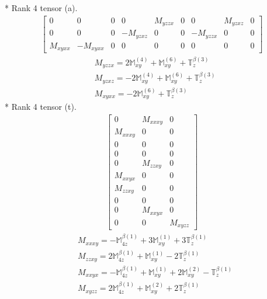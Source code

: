 \documentclass[fleqn,8pt,landscape]{jsarticle}
\begin{document}
* Rank 4 tensor (a).
\begin{align*}
\begin{bmatrix} 0 & 0 & 0 & 0 & M_{yzzx} & 0 & 0 & M_{yzxz} & 0 \\ 0 & 0 & 0 & - M_{yzxz} & 0 & 0 & - M_{yzzx} & 0 & 0 \\ M_{xyxx} & - M_{xyxx} & 0 & 0 & 0 & 0 & 0 & 0 & 0 \end{bmatrix}
\end{align*}
\begin{align*}
& M_{yzzx} = 2 \mathbb{M}_{xy}^{(4)} + \mathbb{M}_{xy}^{(6)} + \mathbb{T}_{z}^{\beta(3)} \\
& M_{yzxz} = - 2 \mathbb{M}_{xy}^{(4)} + \mathbb{M}_{xy}^{(6)} + \mathbb{T}_{z}^{\beta(3)} \\
& M_{xyxx} = - 2 \mathbb{M}_{xy}^{(6)} + \mathbb{T}_{z}^{\beta(3)}
\end{align*}
* Rank 4 tensor (t).
\begin{align*}
\begin{bmatrix} 0 & M_{xxxy} & 0 \\ M_{xxxy} & 0 & 0 \\ 0 & 0 & 0 \\ 0 & 0 & 0 \\ 0 & M_{zzxy} & 0 \\ M_{xxyx} & 0 & 0 \\ M_{zzxy} & 0 & 0 \\ 0 & 0 & 0 \\ 0 & M_{xxyx} & 0 \\ 0 & 0 & M_{xyzz} \end{bmatrix}
\end{align*}
\begin{align*}
& M_{xxxy} = - \mathbb{M}_{4z}^{\beta(1)} + 3 \mathbb{M}_{xy}^{(1)} + 3 \mathbb{T}_{z}^{\beta(1)} \\
& M_{zzxy} = 2 \mathbb{M}_{4z}^{\beta(1)} + \mathbb{M}_{xy}^{(1)} - 2 \mathbb{T}_{z}^{\beta(1)} \\
& M_{xxyx} = - \mathbb{M}_{4z}^{\beta(1)} + \mathbb{M}_{xy}^{(1)} + 2 \mathbb{M}_{xy}^{(2)} - \mathbb{T}_{z}^{\beta(1)} \\
& M_{xyzz} = 2 \mathbb{M}_{4z}^{\beta(1)} + \mathbb{M}_{xy}^{(2)} + 2 \mathbb{T}_{z}^{\beta(1)}
\end{align*}
\end{document}
